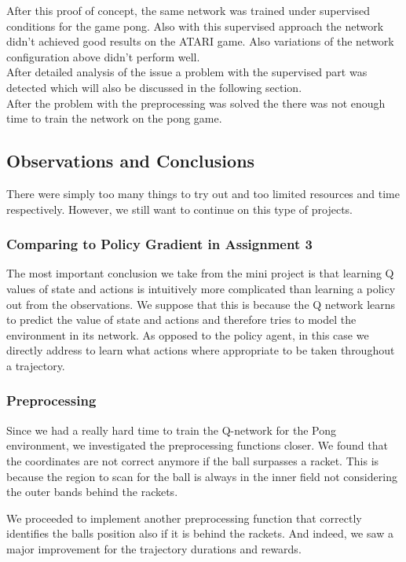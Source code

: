 \documentclass[10pt,a4paper]{article}
\begin{document}
\noindent After this proof of concept, the same network was trained under supervised conditions for the game pong. Also with this supervised approach the network didn't achieved good results on the ATARI game. Also variations of the network configuration above didn't perform well.\\
After detailed analysis of the issue a problem with the supervised part was detected which will also be discussed in the following section.\\
After the problem with the preprocessing was solved the there was not enough time to train the network on the pong game.

\subsection{Observations and Conclusions}
There were simply too many things to try out and too limited resources and time respectively. However, we still want to continue on this type of projects.

\subsubsection{Comparing to Policy Gradient in Assignment 3}
The most important conclusion we take from the mini project is that learning Q values of state and actions is intuitively more complicated than learning a policy out from the observations. We suppose that this is because the Q network learns to predict the value of state and actions and therefore tries to model the environment in its network. As opposed to the policy agent, in this case we directly address to learn what actions where appropriate to be taken throughout a trajectory.

\subsubsection{Preprocessing}
Since we had a really hard time to train the Q-network for the Pong environment, we investigated the preprocessing functions closer. We found that the coordinates are not correct anymore if the ball surpasses a racket. This is because the region to scan for the ball is always in the inner field not considering the outer bands behind the rackets.

We proceeded to implement another preprocessing function that correctly identifies the balls position also if it is behind the rackets. And indeed, we saw a major improvement for the trajectory durations and rewards.
\end{document}
